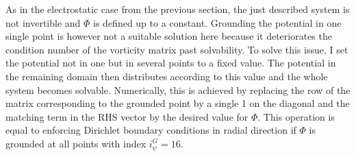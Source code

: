 As in the electrostatic case from the previous section, the just described system is not invertible and $\Phi$ is defined up to a constant. Grounding the potential in one single point is however not a suitable solution here because it deteriorates the condition number of the vorticity matrix past solvability. To solve this issue, I set the potential not in one but in several points to a fixed value. The potential in the remaining domain then distributes according to this value and the whole system becomes solvable. Numerically, this is achieved by replacing the row of the matrix corresponding to the grounded point by a single 1 on the diagonal and the matching term in the RHS vector by the desired value for $\Phi$. This operation is equal to enforcing Dirichlet boundary conditions in radial direction if $\Phi$ is grounded at all points with index $i_\psi^G=16$. 
%
